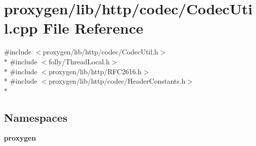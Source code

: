 \section{proxygen/lib/http/codec/\+Codec\+Util.cpp File Reference}
\label{CodecUtil_8cpp}
{\ttfamily \#include $<$proxygen/lib/http/codec/\+Codec\+Util.\+h$>$}\\*
{\ttfamily \#include $<$folly/\+Thread\+Local.\+h$>$}\\*
{\ttfamily \#include $<$proxygen/lib/http/\+R\+F\+C2616.\+h$>$}\\*
{\ttfamily \#include $<$proxygen/lib/http/codec/\+Header\+Constants.\+h$>$}\\*
\subsection*{Namespaces}
\begin{DoxyCompactItemize}
\item 
 {\bf proxygen}
\end{DoxyCompactItemize}
